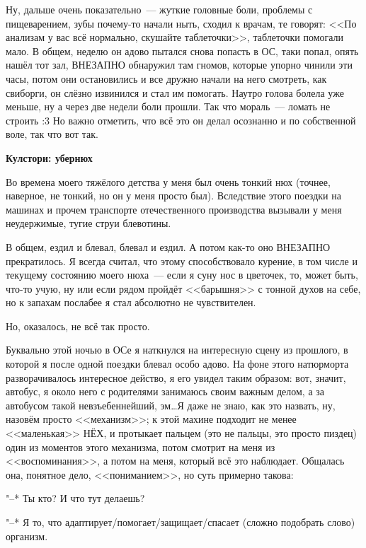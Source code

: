 \documentclass[a5paper,12pt,twoside]{memoir}
\begin{document}
Ну, дальше очень показательно~--- жуткие головные боли, проблемы с пищеварением, зубы почему-то начали ныть, сходил к врачам, те говорят: <<По анализам у вас всё нормально, скушайте таблеточки>>, таблеточки помогали мало. В общем, неделю он адово пытался снова попасть в ОС, таки попал, опять нашёл тот зал, ВНЕЗАПНО обнаружил там гномов, которые упорно чинили эти часы, потом они остановились и все дружно начали на него смотреть, как свиборги, он слёзно извинился и стал им помогать. Наутро голова болела уже меньше, ну а через две недели боли прошли. Так что мораль~--- ломать не строить :3 Но важно отметить, что всё это он делал осознанно и по собственной воле, так что вот так.

\begin{shaded}

\begin{center}
\Large\textbf{Кулстори: убернюх}
\end{center}


Во времена моего тяжёлого детства у меня был очень тонкий нюх (точнее, наверное, не тонкий, но он у меня просто был). Вследствие этого поездки на машинах и прочем транспорте отечественного производства вызывали у меня неудержимые, тугие струи блевотины.

В общем, ездил и блевал, блевал и ездил. А потом как-то оно ВНЕЗАПНО прекратилось. Я всегда считал, что этому способствовало курение, в том числе и текущему состоянию моего нюха~--- если я суну нос в цветочек, то, может быть, что-то учую, ну или если рядом пройдёт <<барышня>> с тонной духов на себе, но к запахам послабее я стал абсолютно не чувствителен.

Но, оказалось, не всё так просто.

Буквально этой ночью в ОСе я наткнулся на интересную сцену из прошлого, в которой я после одной поездки блевал особо адово. На фоне этого натюрморта разворачивалось интересное действо, я его увидел таким образом: вот, значит, автобус, я около него с родителями занимаюсь своим важным делом, а за автобусом такой невзъебеннейший, эм\ldots Я даже не знаю, как это назвать, ну, назовём просто <<механизм>>; к этой махине подходит не менее <<маленькая>> НЁХ, и протыкает пальцем (это не пальцы, это просто пиздец) один из моментов этого механизма, потом смотрит на меня из <<воспоминания>>, а потом на меня, который всё это наблюдает. Общалась она, понятное дело, <<пониманием>>, но суть примерно такова:

"--* Ты кто? И что тут делаешь?

"--* Я то, что а\-да\-пти\-ру\-ет/по\-мо\-га\-ет/за\-щи\-ща\-ет/спа\-са\-ет (сложно подобрать слово) организм.


\end{shaded}
\end{document}
